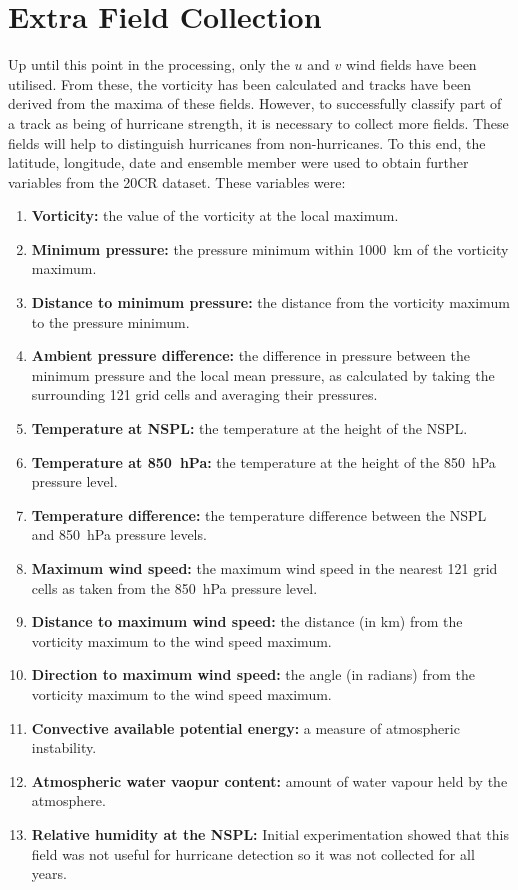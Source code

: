 \documentclass[pdftex,12pt,a4paper]{report}
\begin{document}

\newpage
\section{Extra Field Collection}
\label{sec:extra_field_collection}

Up until this point in the processing, only the $u$ and $v$ wind fields have been utilised. From
these, the vorticity has been calculated and tracks have been derived from the maxima of these
fields.  However, to successfully classify part of a track as being of hurricane strength, it is
necessary to collect more fields. These fields will help to distinguish hurricanes from
non-hurricanes. To this end, the latitude, longitude, date and ensemble member were used to obtain
further variables from the 20CR dataset. These variables were:

\begin{enumerate}
    \item \textbf{Vorticity:} the value of the vorticity at the local maximum.
    \item \textbf{Minimum pressure:} the pressure minimum within \SI{1000}{km} of the vorticity
        maximum.
    \item \textbf{Distance to minimum pressure:} the distance from the vorticity maximum to the
        pressure minimum.
    \item \textbf{Ambient pressure difference:} the difference in pressure between the minimum
        pressure and the local mean pressure, as calculated by taking the surrounding 121 grid cells
        and averaging their pressures.
    \item \textbf{Temperature at NSPL:} the temperature at the height of the NSPL.
    \item \textbf{Temperature at \SI{850}{hPa}:} the temperature at the height of the \SI{850}{hPa}
        pressure level.
    \item \textbf{Temperature difference:} the temperature difference between the NSPL and
        \SI{850}{hPa} pressure levels.
    \item \textbf{Maximum wind speed:} the maximum wind speed in the nearest 121 grid cells as taken
        from the \SI{850}{hPa} pressure level.
    \item \textbf{Distance to maximum wind speed:} the distance (in km) from the vorticity
        maximum to the wind speed maximum.
    \item \textbf{Direction to maximum wind speed:} the angle (in radians) from the vorticity
        maximum to the wind speed maximum.
    \item \textbf{Convective available potential energy:} a measure of atmospheric instability.
    \item \textbf{Atmospheric water vaopur content:} amount of water vapour held by the atmosphere.
    \item \textbf{Relative humidity at the NSPL:} Initial experimentation showed that this field was
        not useful for hurricane detection so it was not collected for all years.
\end{enumerate}
\end{document}
